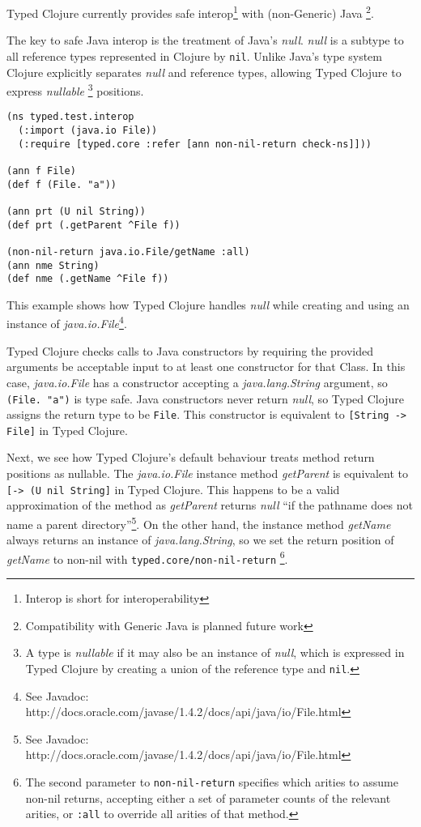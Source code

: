 Typed Clojure currently provides safe interop\footnote{Interop is short for interoperability} with (non-Generic) Java
\footnote{Compatibility with Generic Java is planned future work}.

The key to safe Java interop is the treatment of Java's \emph{null}.
\emph{null} is a subtype to all reference types
represented in Clojure by \lstinline|nil|. Unlike Java's type system
Clojure explicitly separates \emph{null} and reference types, allowing
Typed Clojure to express
\emph{nullable}
\footnote{A type is \emph{nullable} if it may also be an instance of \emph{null},
which is expressed in Typed Clojure by creating a union of the reference type and \lstinline|nil|.}
positions.

\begin{lstlisting}
(ns typed.test.interop
  (:import (java.io File))
  (:require [typed.core :refer [ann non-nil-return check-ns]]))

(ann f File)
(def f (File. "a"))

(ann prt (U nil String))
(def prt (.getParent ^File f))

(non-nil-return java.io.File/getName :all)
(ann nme String)
(def nme (.getName ^File f))

\end{lstlisting}

This example shows how Typed Clojure handles \emph{null} while creating and
using an instance of \emph{java.io.File}\footnote{See Javadoc: http://docs.oracle.com/javase/1.4.2/docs/api/java/io/File.html}.

Typed Clojure checks calls to Java constructors by requiring the provided
arguments be acceptable input to at least one constructor for that Class.
In this case, \emph{java.io.File} has a constructor accepting a \emph{java.lang.String}
argument, so \lstinline|(File. "a")| is type safe. Java constructors never
return \emph{null}, so Typed Clojure assigns the return type to be \lstinline|File|.
This constructor is equivalent to \lstinline|[String -> File]| in Typed Clojure.

Next, we see how Typed Clojure's default behaviour treats method return positions as nullable.
The \emph{java.io.File} instance method \emph{getParent}
is equivalent to \lstinline|[-> (U nil String]| in Typed Clojure. This happens to be
a valid approximation of the method as \emph{getParent} returns \emph{null} 
``if the pathname does not name a parent directory''\footnote{See Javadoc: http://docs.oracle.com/javase/1.4.2/docs/api/java/io/File.html}.
On the other hand, the instance method \emph{getName} always returns an
instance of \emph{java.lang.String}, so we set the return position of
\emph{getName} to non-nil with \lstinline|typed.core/non-nil-return|
\footnote{The second parameter to \lstinline|non-nil-return| specifies which arities to assume non-nil 
returns, accepting either a set of parameter counts of the relevant arities, or \lstinline|:all|
to override all arities of that method.}.
